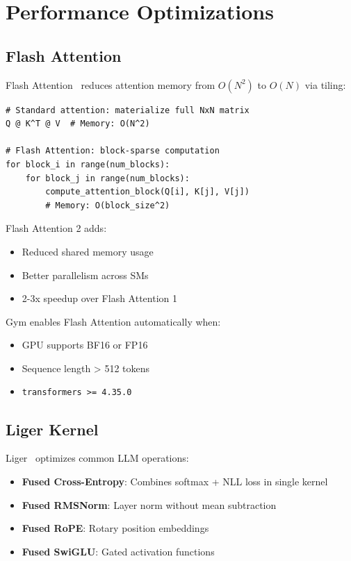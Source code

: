 \section{Performance Optimizations}


\subsection{Flash Attention}

Flash Attention~\citep{dao2023flashattention} reduces attention memory from $O(N^2)$ to $O(N)$ via tiling:

\begin{verbatim}
# Standard attention: materialize full NxN matrix
Q @ K^T @ V  # Memory: O(N^2)

# Flash Attention: block-sparse computation
for block_i in range(num_blocks):
    for block_j in range(num_blocks):
        compute_attention_block(Q[i], K[j], V[j])
        # Memory: O(block_size^2)
\end{verbatim}

Flash Attention 2 adds:
\begin{itemize}
\item Reduced shared memory usage
\item Better parallelism across SMs
\item 2-3x speedup over Flash Attention 1
\end{itemize}

Gym enables Flash Attention automatically when:
\begin{itemize}
\item GPU supports BF16 or FP16
\item Sequence length > 512 tokens
\item \texttt{transformers >= 4.35.0}
\end{itemize}

\subsection{Liger Kernel}

Liger~\citep{hsu2024liger} optimizes common LLM operations:

\begin{itemize}
\item \textbf{Fused Cross-Entropy}: Combines softmax + NLL loss in single kernel
\item \textbf{Fused RMSNorm}: Layer norm without mean subtraction
\item \textbf{Fused RoPE}: Rotary position embeddings
\item \textbf{Fused SwiGLU}: Gated activation functions
\end{itemize}

